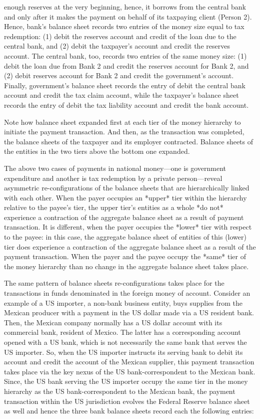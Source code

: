enough reserves at the very beginning, hence, it borrows from the
central bank and only after it makes the payment on behalf of its
taxpaying client (Person 2). Hence, bank's balance sheet records two
entries of the money size equal to tax redemption: (1) debit the
reserves account and credit of the loan due to the central bank, and (2)
debit the taxpayer's account and credit the reserves account. The
central bank, too, records two entries of the same money size: (1) debit
the loan due from Bank 2 and credit the reserves account for Bank 2, and
(2) debit reserves account for Bank 2 and credit the government's
account. Finally, government's balance sheet records the entry of debit
the central bank account and credit the tax claim account, while the
taxpayer's balance sheet records the entry of debit the tax liability
account and credit the bank account.

Note how balance sheet expanded first at each tier of the money
hierarchy to initiate the payment transaction. And then, as the
transaction was completed, the balance sheets of the taxpayer and its
employer contracted. Balance sheets of the entities in the two tiers
above the bottom one expanded.

The above two cases of payments in national money---one is government
expenditure and another is tax redemption by a private person---reveal
asymmetric re-configurations of the balance sheets that are
hierarchically linked with each other. When the payer occupies an
*upper* tier within the hierarchy relative to the payee's tier, the
upper tier's entities as a whole *do not* experience a contraction of
the aggregate balance sheet as a result of payment transaction. It is
different, when the payer occupies the *lower* tier with respect to the
payee: in this case, the aggregate balance sheet of entities of this
(lower) tier does experience a contraction of the aggregate balance
sheet as a result of the payment transaction. When the payer and the
payee occupy the *same* tier of the money hierarchy than no change in
the aggregate balance sheet takes place.

The same pattern of balance sheets re-configurations takes place for the
transactions in funds denominated in the foreign money of account.
Consider an example of a US importer, a non-bank business entity, buys
supplies from the Mexican producer with a payment in the US dollar made
via a US resident bank. Then, the Mexican company normally has a US
dollar account with its commercial bank, resident of Mexico. The latter
has a corresponding account opened with a US bank, which is not
necessarily the same bank that serves the US importer. So, when the US
importer instructs its serving bank to debit its account and credit the
account of the Mexican supplier, this payment transaction takes place
via the key nexus of the US bank-correspondent to the Mexican bank.
Since, the US bank serving the US importer occupy the same tier in the
money hierarchy as the US bank-correspondent to the Mexican bank, the
payment transaction within the US jurisdiction evolves the Federal
Reserve balance sheet as well and hence the three bank balance sheets
record each the following entries:

